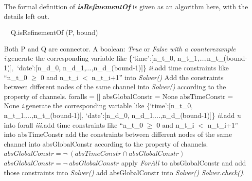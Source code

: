 \documentclass[3p,times]{elsarticle}
\begin{document}
The formal definition of \textbf{\emph{isRefinementOf}} is given as an algorithm here, with the details left out.
\begin{algorithm}[t]
    \caption{\ \ Q.isRefinementOf (P, bound)}
    \begin{algorithmic}[1]
        \REQUIRE Both P and Q are connector.
        \ENSURE A boolean: \emph{True} or \emph{False with a counterexample}
					\STATE \emph{\large i.}generate the corresponding variable like 					
						\newline  \{`time':[n\_t\_0, n\_t\_1,...,n\_t\_(bound-1)],\  `date':[n\_d\_0, n\_d\_1,...,n\_d\_(bound-1)]\}
						\newline
						\newline \emph{\large ii.}add time constraints like ``n\_t\_0 $\geq$ 0  and  n\_t\_i $<$ n\_t\_i+1'' into \emph{Solver()}
				\ENDIF
			\ENDFOR
		\STATE Add the constraints between different nodes of the same channel into \emph{Solver()} according to the property of channels.
        \ENDFOR
        \newline
        \STATE foralls = []      %
        \STATE absGlobalConstr = None %
        \STATE absTimeConstr = None %
					\STATE \emph{\large i.}generate the corresponding variable like 					
						\newline \{`time':[n\_t\_0, n\_t\_1,...,n\_t\_(bound-1)], `date':[n\_d\_0, n\_d\_1,...,n\_d\_(bound-1)]\}
						\newline
						\newline \emph{\large ii.}add \emph{n} into forall
						\newline
						\newline \emph{\large iii.}add time constraints like ``n\_t\_0 $\geq$ 0  and  n\_t\_i $<$ n\_t\_i+1'' into absTimeConstr
				\ENDIF
			\STATE add the constraints between different nodes of the same channel into absGlobalConstr according to the property of channels.
			\ENDFOR
		\ENDFOR
		\newline
		\STATE $absGlobalConstr = \neg \ (absTimeConstr \cap absGlobalConstr)  $
	\ELSE
		\STATE $absGlobalConstr = \neg \ absGlobalConstr$
	\ENDIF
		\STATE apply \emph{ForAll} to absGlobalConstr
			 and add those constraints into \emph{Solver()}
    \ELSE
    	\STATE add absGlobalConstr into \emph{Solver()}
	\ENDIF	
    \STATE \emph{Solver.check()}.
    \end{algorithmic}
\end{algorithm}
\end{document}
